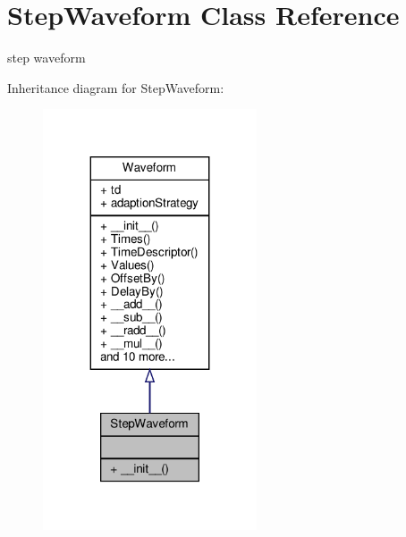 \hypertarget{classSignalIntegrity_1_1TimeDomain_1_1Waveform_1_1StepWaveform_1_1StepWaveform}{}\section{Step\+Waveform Class Reference}
\label{classSignalIntegrity_1_1TimeDomain_1_1Waveform_1_1StepWaveform_1_1StepWaveform}


step waveform  




Inheritance diagram for Step\+Waveform\+:
\nopagebreak
\begin{figure}[H]
\begin{center}
\leavevmode
\includegraphics[width=179pt]{classSignalIntegrity_1_1TimeDomain_1_1Waveform_1_1StepWaveform_1_1StepWaveform__inherit__graph}
\end{center}
\end{figure}


